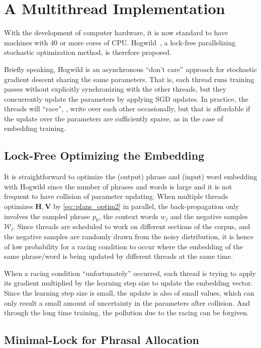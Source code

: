\section{A Multithread Implementation}

With the development of computer hardware, it is now standard to have machines
with 40 or more cores of CPU. Hogwild~\cite{recht2011hogwild}, a lock-free
parallelizing stochastic optimization method, is therefore proposed.

Briefly speaking, Hogwild is an asynchronous ``don't care'' approach for
stochastic gradient descent sharing the same parameters. That is, each thread
runs training passes without explicitly synchronizing with the other threads,
but they concurrently update the parameters by applying SGD updates. In
practice, the threads will ``race'', \ie, write over each other occasionally,
but that is affordable if the update over the parameters are sufficiently
sparse, as in the case of embedding training.

\subsection{Lock-Free Optimizing the Embedding}

It is straightforward to optimize the (output) phrase and (input) word embedding
with Hogwild since the number of phrases and words is large and it is not
frequent to have collision of parameter updating. When multiple threads
optimizes $\mathbf{H, V}$ by \eqref{eq::plans_optim2} in parallel, the
back-propagation only involves the sampled phrase $p_k$, the context words $w_j$
and the negative samples $\mathcal{W}_l$. Since threads are scheduled to work on
different sections of the corpus, and the negative samples are randomly drawn
from the noisy distribution, it is hence of low probability for a racing
condition to occur where the embedding of the same phrase/word is being
updated by different threads at the same time.

When a racing condition ``unfortunately'' occurred, each thread is trying to
apply its gradient multiplied by the learning step size to update the embedding
vector. Since the learning step size is small, the update is also of small
values, which can only result a small amount of uncertainty in the parameters
after collision. And through the long time training, the pollution due to the
racing can be forgiven.

\subsection{Minimal-Lock for Phrasal Allocation}

